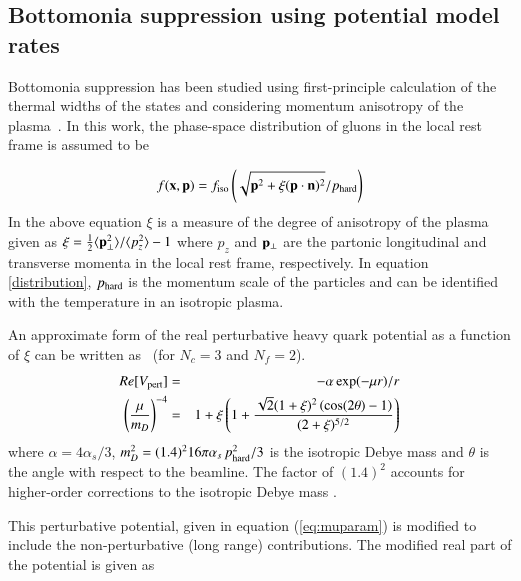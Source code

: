 {{\subsection{Bottomonia suppression using potential model rates}

Bottomonia suppression has been studied using first-principle
calculation of the thermal widths of the states and considering 
momentum anisotropy of the plasma~\cite{Strickland:2011aa,Krouppa:2016jcl,Krouppa:2018lkt}.
In this work, the phase-space distribution of gluons in the local
rest frame is assumed to be 

\begin{equation} 
f({\bf x},{\bf p}) = f_{\rm iso}\left(\sqrt{{\bf p}^2+ \xi({\bf p}\cdot{\bf n})^2 }  / 
p_{\rm hard} \right) 
\label{distribution}
\end{equation} 
In the above equation $\xi$ is a measure of the degree of anisotropy of the plasma given as 
$\xi = \frac{1}{2} \langle 
{\bf p}_\perp^2\rangle/\langle p_z^2\rangle -1$
where $p_z$ and 
${\bf p}_\perp $ are the partonic longitudinal and transverse momenta in the local
rest frame, respectively. In equation \ref{distribution}, $p_{\rm hard}$ is the momentum  
scale of the particles and can be identified with the temperature
in an isotropic plasma. 

An approximate form of the real perturbative heavy quark potential as a function of
$\xi$ can be written as~\cite{Dumitru:2007hy} (for $N_c=3$ and $N_f=2$). 
\begin{eqnarray}
Re[V_{\rm pert}] &=& - \alpha \exp(-\mu r)/r \nonumber \\
\left(\frac{\mu}{m_D}\right)^{-4} &=&  
1 + \xi\left(1 + \frac{\sqrt{2}(1+\xi)^2\left(\cos(2\theta) - 1 \right)}{(2+ \xi)^{5/2}} \right) 
\label{eq:muparam}
\end{eqnarray}
where $\alpha = 4\alpha_s/3$, $m_D^2 = (1.4)^2 16 \pi \alpha_s  \, p_{\rm hard}^2/3$ is the isotropic
Debye mass and $\theta$ is the angle with respect to the beamline.  
The factor of $(1.4)^2$ accounts for higher-order corrections to the isotropic Debye 
mass \cite{Kaczmarek:2004gv}.

This perturbative potential, given in equation (\ref{eq:muparam}) is modified to include
the non-perturbative (long range) contributions. 
The modified real part of the potential is given as~\cite{Dumitru:2007hy} 


}}
